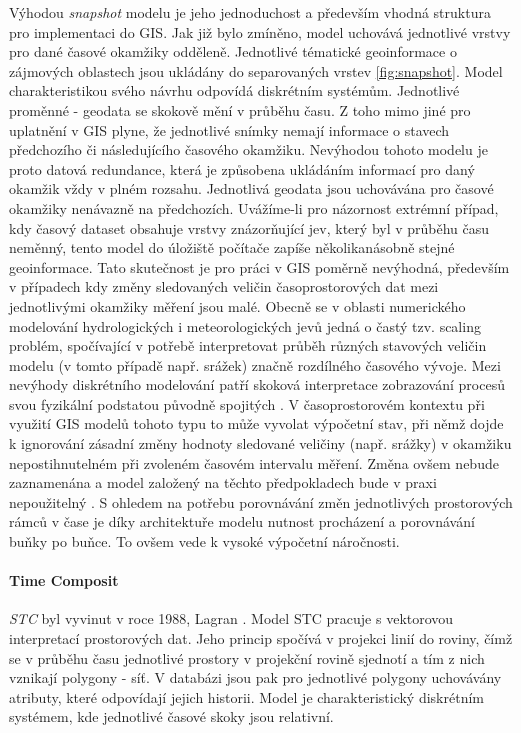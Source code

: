 \documentclass[a4paper,12pt,oneside]{report}
\begin{document}
Výhodou \textit{snapshot} modelu je jeho jednoduchost a především
vhodná struktura pro implementaci do GIS. Jak již bylo zmíněno, model
uchovává jednotlivé vrstvy pro dané časové okamžiky odděleně.
Jednotlivé tématické geoinformace o zájmových oblastech jsou ukládány do
separovaných vrstev \ref{fig:snapshot}.  Model charakteristikou svého návrhu odpovídá
diskrétním systémům. Jednotlivé proměnné - geodata se skokově mění v
průběhu času. Z toho mimo jiné pro uplatnění v GIS plyne, že
jednotlivé snímky nemají informace o stavech předchozího či
následujícího časového okamžiku.  Nevýhodou tohoto modelu je proto datová
redundance, která je způsobena ukládáním informací pro daný okamžik
vždy v plném rozsahu.  Jednotlivá geodata jsou uchovávána pro časové
okamžiky nenávazně na předchozích. Uvážíme-li pro názornost extrémní
případ, kdy časový dataset obsahuje vrstvy znázorňující jev, který byl
v průběhu času neměnný, tento model do úložiště počítače zapíše
několikanásobně stejné geoinformace. Tato skutečnost je pro práci v GIS poměrně nevýhodná, především v případech kdy změny sledovaných veličin časoprostorových dat mezi jednotlivými okamžiky měření jsou malé. Obecně se v oblasti numerického modelování hydrologických i meteorologických jevů jedná o častý tzv. scaling problém, spočívající v potřebě interpretovat průběh různých stavových veličin modelu (v tomto případě např. srážek) značně rozdílného časového vývoje. Mezi nevýhody diskrétního modelování patří skoková interpretace zobrazování procesů svou fyzikální podstatou původně spojitých . V časoprostorovém kontextu při využití GIS modelů tohoto typu to může vyvolat výpočetní stav, při němž dojde k ignorování zásadní změny hodnoty sledované veličiny (např. srážky) v okamžiku nepostihnutelném při zvoleném časovém intervalu měření.  Změna ovšem nebude zaznamenána a model založený na těchto předpokladech bude v praxi nepoužitelný . S ohledem na  potřebu porovnávání změn jednotlivých prostorových rámců v čase je díky architektuře modelu nutnost procházení a porovnávání buňky po buňce. To ovšem  vede k vysoké výpočetní  náročnosti.

\paragraph*{Time Composit}
\textit{\ac{STC}} byl vyvinut  v roce
1988, Lagran \cite{lagran}. Model \acs{STC} pracuje s vektorovou interpretací
 prostorových dat. Jeho princip  spočívá v projekci linií do roviny, čímž se v
průběhu času jednotlivé prostory v projekční rovině sjednotí a tím z
nich vznikají polygony - síť. V databázi jsou pak pro jednotlivé
polygony uchovávány atributy, které odpovídají jejich historii.  Model
je charakteristický diskrétním systémem, kde jednotlivé časové skoky
jsou relativní.
\end{document}
